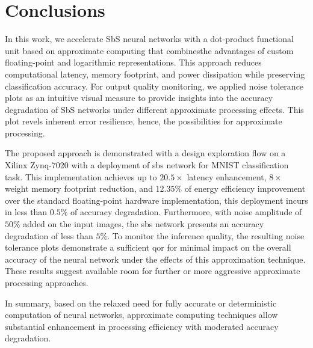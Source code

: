 \section{Conclusions}
\label{sec:conclusions}
In this work, we accelerate SbS neural networks with a dot-product functional unit based on approximate computing that combinesthe advantages of custom floating-point and logarithmic representations. This approach reduces computational latency, memory footprint, and power dissipation while preserving classification accuracy. For output quality monitoring, we applied noise tolerance plots as an intuitive visual measure to provide insights into the accuracy degradation of SbS networks under different approximate processing effects. This plot revels inherent error resilience, hence, the possibilities for approximate processing.


The proposed approach is demonstrated with a design exploration flow on a Xilinx Zynq-7020 with a deployment of \gls{sbs} network for MNIST classification task. This implementation achieves up to $20.5\times$ latency enhancement, $8\times$ weight memory footprint reduction, and $12.35\%$ of energy efficiency improvement over the standard floating-point hardware implementation, this deployment incurs in less than $0.5\%$ of accuracy degradation. Furthermore, with noise amplitude of $50\%$ added on the input images, the \gls{sbs} network presents an accuracy degradation of less than $5\%$. To monitor the inference quality, the resulting noise tolerance plots demonstrate a sufficient \gls{qor} for minimal impact on the overall accuracy of the neural network under the effects of this approximation technique. These results suggest available room for further or more aggressive approximate processing approaches.


In summary, based on the relaxed need for fully accurate or deterministic computation of neural networks, approximate computing techniques allow substantial enhancement in processing efficiency with moderated accuracy degradation.
